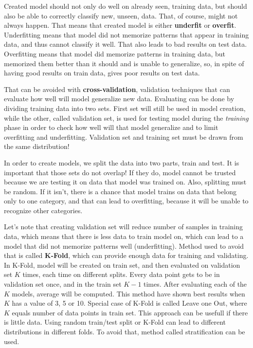 \documentclass[a4paper]{article}
\begin{document}
Created model should not only do well on already seen, training data, but should also be able to correctly classify new, unseen, data. That, of course, might not always happen. That means that created model is either \textbf{underfit} or \textbf{overfit}. Underfitting means that model did not memorize patterns that appear in training data, and thus cannot classify it well. That also leads to bad results on test data. Overfitting means that model did memorize patterns in training data, but memorized them better than it should and is unable to generalize, so, in spite of having good results on train data, gives poor results on test data.

That can be avoided with \textbf{cross-validation}, validation techniques that can evaluate how well will model generalize new data. Evaluating can be done by dividing training data into two sets. First set will still be used in model creation, while the other, called validation set, is used for testing model during the \textit{training} phase in order to check how well will that model generalize and to limit overfitting and underfitting. Validation set and training set must be drawn from the same distribution! \cite{crossVal}

In order to create models, we split the data into two parts, train and test. It is important that those sets do not overlap! If they do, model cannot be trusted because we are testing it on data that model was trained on. Also, splitting must be random. If it isn't, there is a chance that model trains on data that belong only to one category, and that can lead to overfitting, because it will be unable to recognize other categories. \cite{crossVal}

Let's note that creating validation set will reduce number of samples in training data, which means that there is less data to train model on, which can lead to a model that did not memorize patterns well (underfitting). Method used to avoid that is called \textbf{K-Fold}, which can provide enough data for training and validating. In K-Fold, model will be created on train set, and then evaluated on validation set $K$ times, each time on different splits. Every data point gets to be in validation set once, and in the train set $K-1$ times. After evaluating each of the $K$ models, average will be computed. This method have shown best results when $K$ has a value of 3, 5 or 10. Special case of K-Fold is called Leave one Out, where $K$ equals number of data points in train set. This approach can be usefull if there is little data. Using random train/test split or K-Fold can lead to different distributions in different folds. To avoid that, method called stratification can be used. \cite{crossVal}
\end{document}
